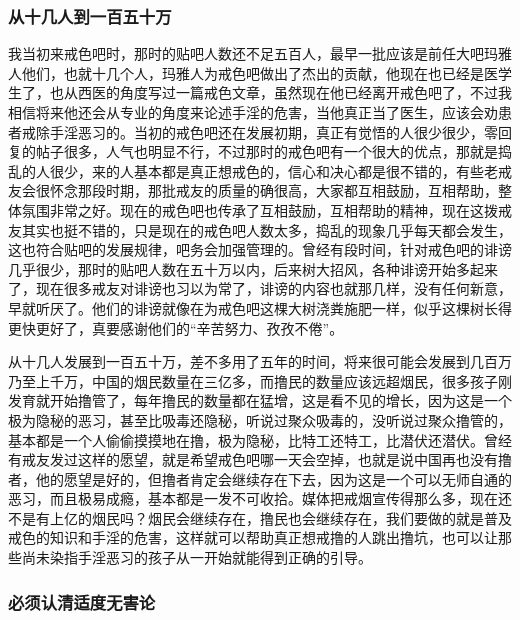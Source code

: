 \subsubsection{从十几人到一百五十万}

我当初来戒色吧时，那时的贴吧人数还不足五百人，最早一批应该是前任大吧玛雅人他们，也就十几个人，玛雅人为戒色吧做出了杰出的贡献，他现在也已经是医学生了，也从西医的角度写过一篇戒色文章，虽然现在他已经离开戒色吧了，不过我相信将来他还会从专业的角度来论述手淫的危害，当他真正当了医生，应该会劝患者戒除手淫恶习的。当初的戒色吧还在发展初期，真正有觉悟的人很少很少，零回复的帖子很多，人气也明显不行，不过那时的戒色吧有一个很大的优点，那就是捣乱的人很少，来的人基本都是真正想戒色的，信心和决心都是很不错的，有些老戒友会很怀念那段时期，那批戒友的质量的确很高，大家都互相鼓励，互相帮助，整体氛围非常之好。现在的戒色吧也传承了互相鼓励，互相帮助的精神，现在这拨戒友其实也挺不错的，只是现在的戒色吧人数太多，捣乱的现象几乎每天都会发生，这也符合贴吧的发展规律，吧务会加强管理的。曾经有段时间，针对戒色吧的诽谤几乎很少，那时的贴吧人数在五十万以内，后来树大招风，各种诽谤开始多起来了，现在很多戒友对诽谤也习以为常了，诽谤的内容也就那几样，没有任何新意，早就听厌了。他们的诽谤就像在为戒色吧这棵大树浇粪施肥一样，似乎这棵树长得更快更好了，真要感谢他们的“辛苦努力、孜孜不倦”。

从十几人发展到一百五十万，差不多用了五年的时间，将来很可能会发展到几百万乃至上千万，中国的烟民数量在三亿多，而撸民的数量应该远超烟民，很多孩子刚发育就开始撸管了，每年撸民的数量都在猛增，这是看不见的增长，因为这是一个极为隐秘的恶习，甚至比吸毒还隐秘，听说过聚众吸毒的，没听说过聚众撸管的，基本都是一个人偷偷摸摸地在撸，极为隐秘，比特工还特工，比潜伏还潜伏。曾经有戒友发过这样的愿望，就是希望戒色吧哪一天会空掉，也就是说中国再也没有撸者，他的愿望是好的，但撸者肯定会继续存在下去，因为这是一个可以无师自通的恶习，而且极易成瘾，基本都是一发不可收拾。媒体把戒烟宣传得那么多，现在还不是有上亿的烟民吗？烟民会继续存在，撸民也会继续存在，我们要做的就是普及戒色的知识和手淫的危害，这样就可以帮助真正想戒撸的人跳出撸坑，也可以让那些尚未染指手淫恶习的孩子从一开始就能得到正确的引导。

\subsubsection{必须认清适度无害论}

